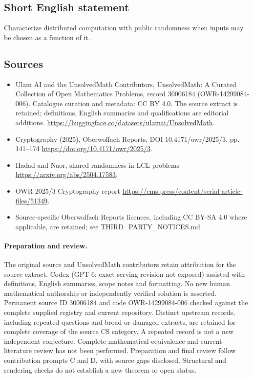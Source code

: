 \documentclass[11pt]{article}
\begin{document}
\subsection{Short English statement}
Characterize distributed computation with public randomness when inputs may be chosen as a function of it.
\subsection{Sources}
\begin{itemize}
\item[\hypertarget{source:30006184:1}{S1}] Ulam AI and the UnsolvedMath Contributors, UnsolvedMath: A Curated Collection of Open Mathematics Problems, record 30006184 (OWR-14299084-006). Catalogue curation and metadata: CC BY 4.0. The source extract is retained; definitions, English summaries and qualifications are editorial additions.
\url{https://huggingface.co/datasets/ulamai/UnsolvedMath}.
\item[\hypertarget{source:30006184:2}{S2}] Cryptography (2025), Oberwolfach Reports, DOI 10.4171/owr/2025/3, pp. 141--174
\url{https://doi.org/10.4171/owr/2025/3}.
\item[\hypertarget{source:30006184:3}{S3}] Hadad and Naor, shared randomness in LCL problems
\url{https://arxiv.org/abs/2504.17583}.
\item[\hypertarget{source:30006184:4}{S4}] OWR 2025/3 Cryptography report
\url{https://ems.press/content/serial-article-files/51349}.
\item Source-specific Oberwolfach Reports licences, including CC BY-SA 4.0 where applicable, are retained; see THIRD\_PARTY\_NOTICES.md.
\end{itemize}
\paragraph{Preparation and review.}
The original source and UnsolvedMath contributors retain attribution for the source extract. Codex (GPT-6; exact serving revision not exposed) assisted with definitions, English summaries, scope notes and formatting. No new human mathematical authorship or independently verified solution is asserted. Permanent source ID 30006184 and code OWR-14299084-006 checked against the complete supplied registry and current repository. Distinct upstream records, including repeated questions and broad or damaged extracts, are retained for complete coverage of the source CS category. A repeated record is not a new independent conjecture. Complete mathematical-equivalence and current-literature review has not been performed. Preparation and final review follow contribution prompts C and D, with source gaps disclosed. Structural and rendering checks do not establish a new theorem or open status.
\label{end:30006184}
\end{document}
